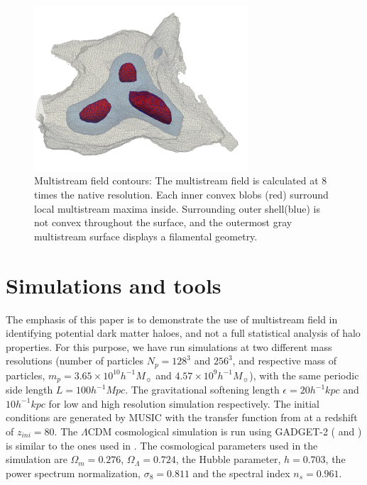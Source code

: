 \documentclass[fleqn,usenatbib,useAMS]{mnras}
\begin{document}
\begin{figure} 
\centering\includegraphics[width=8cm]{fig2.pdf} 
\caption{Multistream field contours: The multistream field is calculated at 8 times the native resolution. Each inner convex blobs (red) surround local multistream maxima inside. Surrounding outer shell(blue) is not convex throughout the surface, and the outermost gray multistream surface displays a filamental geometry.}
\label{fig:full}
\end{figure}


\section{Simulations and tools}
\label{sec:simulation}

The emphasis of this paper is to demonstrate the use of multistream field in identifying potential dark matter haloes, and not a full statistical analysis of halo properties. For this purpose, we have run simulations at two different mass resolutions (number of particles $N_p = 128^3$ and $256^3$, and respective mass of particles, $m_p = 3.65 \times 10^{10} h^{-1} M_{\sun}$ and $ 4.57 \times 10^{9} h^{-1} M_{\sun}$), with the same periodic side length $L = 100 h^{-1} Mpc$. The gravitational softening length $\epsilon = 20 h^{-1} kpc$ and $10 h^{-1} kpc$ for low and high resolution simulation respectively. The initial conditions are generated by {MUSIC} \citep{Hahn2011a} with the transfer function from \cite{Eisenstein1998a} at a redshift of $z_{ini}= 80$. The $\Lambda$CDM cosmological simulation is run using {GADGET-2} (\citealt{Springel2005} and \citealt{Springel2001}) is similar to the ones used in \cite{Ramachandra2017}. The cosmological parameters used in the simulation are $\Omega_{m}= 0.276$, $\Omega_{\Lambda}= 0.724$, the Hubble parameter, $h = 0.703$, the power spectrum normalization, $\sigma_8 = 0.811$ and the spectral index $n_s= 0.961$. 
\end{document}
